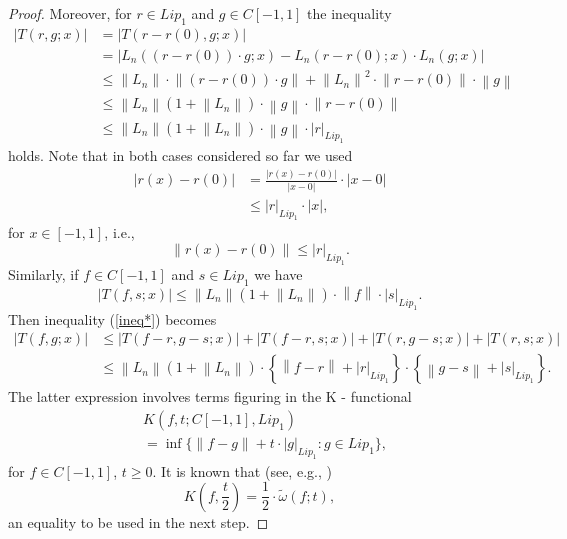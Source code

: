 \documentclass[12pt,leqno,a4paper,dvips,twoside]{article}
\begin{document}
{\begin{proof}
Moreover, for $r\in Lip_1$ and $g\in C[-1,1]$ the inequality
	\begin{align*}
		\left|T(r,g;x)\right|&=\left|T(r-r(0),g;x)\right|\\
								   &=\left|L_n((r-r(0))\cdot g;x)-L_n(r-r(0);x)\cdot L_n(g;x)\right|\\
								   &\leq \left\|L_n\right\|\cdot\left\|(r-r(0))\cdot g\right\|+\left\|L_n\right\|^2\cdot \left\|r-r(0)\right\|\cdot\left\|g\right\|\\
								   &\leq \left\|L_n\right\|(1+\left\|L_n\right\|)\cdot\left\|g\right\|\cdot \left\|r-r(0)\right\|\\
								   &\leq \left\|L_n\right\|(1+\left\|L_n\right\|)\cdot\left\|g\right\|\cdot \left|r\right|_{Lip_1}
	\end{align*}
holds. Note that in both cases considered so far we used
	\begin{align*}
			\left|r(x)-r(0)\right|&=\frac{\left|r(x)-r(0)\right|}{\left|x-0\right|}\cdot \left|x-0\right|\\
			&\leq \left|r\right|_{Lip_1}\cdot \left|x\right|,	
	\end{align*} 
for $x\in [-1,1]$, i.e.,  
	\begin{equation*}
		\left\|r(x)-r(0)\right\|\leq \left|r\right|_{Lip_1}.
	\end{equation*}
Similarly, if $f\in C[-1,1]$ and $s\in Lip_1$ we have
	\begin{equation*}
		\left|T(f,s;x)\right|\leq \left\|L_n\right\|(1+\left\|L_n\right\|)\cdot \left\|f\right\|\cdot \left|s\right|_{Lip_1}.
	\end{equation*}
Then inequality (\ref{ineq*}) becomes
	\begin{align*}
		\left|T(f,g;x)\right|
		&\leq \left|T(f-r,g-s;x)\right|+\left|T(f-r,s;x)\right|+\left|T(r,g-s;x)\right|+\left|T(r,s;x)\right|\\
		&\leq \left\|L_n\right\|(1+\left\|L_n\right\|)\cdot\left\{\left\|f-r\right\|+\left|r\right|_{Lip_1}\right\}\cdot\left\{\left\|g-s\right\|+\left|s\right|_{Lip_1}\right\}.
	\end{align*} 
The latter expression involves terms figuring in the K - functional
	\begin{align*}
		&K(f,t;C[-1,1],Lip_1)\\
		&=\inf\{\left\|f-g\right\|+t\cdot \left|g\right|_{Lip_1}: g\in Lip_1\},	
	\end{align*} 
for $f\in C[-1,1]$, $t\geq 0$.
It is known that (see, e.g., \cite{paltanea:2010})
	\begin{equation*}
		K\left(f,\frac{t}{2}\right)=\frac{1}{2}\cdot \widetilde{\omega}(f;t),
	\end{equation*}
an equality to be used in the next step.


\end{proof}}
\end{document}
